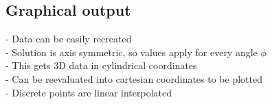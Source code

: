 \documentclass[parskip=half, titlepage=yes, 12pt, BCOR=12mm, DIV=calc]{scrartcl}
\begin{document}
%


\subsection{Graphical output}
- Data can be easily recreated \\
- Solution is axis symmetric, so values apply for every angle $\phi$ \\
- This gets 3D data in cylindrical coordinates \\
- Can be reevaluated into cartesian coordinates to be plotted \\
- Discrete points are linear interpolated \\
\end{document}
